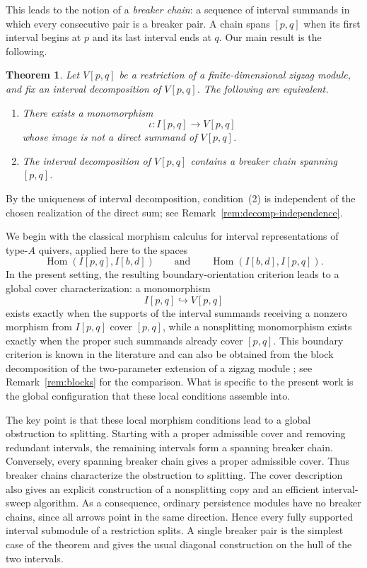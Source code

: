 \documentclass[11pt]{amsart}
\numberwithin{equation}{section}
\newtheorem{theorem}{Theorem}[section]
\theoremstyle{definition}
\begin{document}
This leads to the notion of a \emph{breaker chain}: a sequence of interval
summands in which every consecutive pair is a breaker pair.  A chain spans
$[p,q]$ when its first interval begins at $p$ and its last interval ends at
$q$.  Our main result is the following.

\begin{theorem}\label{thm:main}
Let $V[p,q]$ be a restriction of a finite-dimensional zigzag module, and fix
an interval decomposition of $V[p,q]$.  The following are equivalent.
\begin{enumerate}
\item There exists a monomorphism
\[
\iota:I[p,q]\longrightarrow V[p,q]
\]
whose image is not a direct summand of $V[p,q]$.
\item The interval decomposition of $V[p,q]$ contains a breaker chain
spanning $[p,q]$.
\end{enumerate}
\end{theorem}

By the uniqueness of interval decomposition, condition~(2) is independent of
the chosen realization of the direct sum; see Remark~\ref{rem:decomp-independence}.


We begin with the classical morphism calculus for interval representations of
type-$A$ quivers, applied here to the spaces
\[
\operatorname{Hom}(I[p,q],I[b,d])
\qquad\text{and}\qquad
\operatorname{Hom}(I[b,d],I[p,q]).
\]
In the present setting, the resulting boundary-orientation criterion leads to
a global cover characterization: a monomorphism
\[
I[p,q]\hookrightarrow V[p,q]
\]
exists exactly when the supports of the interval summands receiving a nonzero
morphism from $I[p,q]$ cover $[p,q]$, while a nonsplitting monomorphism exists
exactly when the proper such summands already cover $[p,q]$. This boundary criterion is known in the literature and can also be obtained  from the block
decomposition of the two-parameter extension of a zigzag module
\cite{BotnanLesnick}; see Remark~\ref{rem:blocks} for the comparison.  What is
specific to the present work is the global configuration that these local
conditions assemble into.



The key point is that these local morphism conditions lead to a global
obstruction to splitting. Starting with a proper admissible cover and removing
redundant intervals, the remaining intervals form a spanning breaker chain.
Conversely, every spanning breaker chain gives a proper admissible cover.
Thus breaker chains characterize the obstruction to splitting. The cover
description also gives an explicit construction of a nonsplitting copy and an
efficient interval-sweep algorithm. As a consequence, ordinary persistence modules have no breaker chains, since
all arrows point in the same direction. Hence every fully supported interval
submodule of a restriction splits. A single breaker pair is the simplest case
of the theorem and gives the usual diagonal construction on the hull of the two
intervals.
\end{document}
